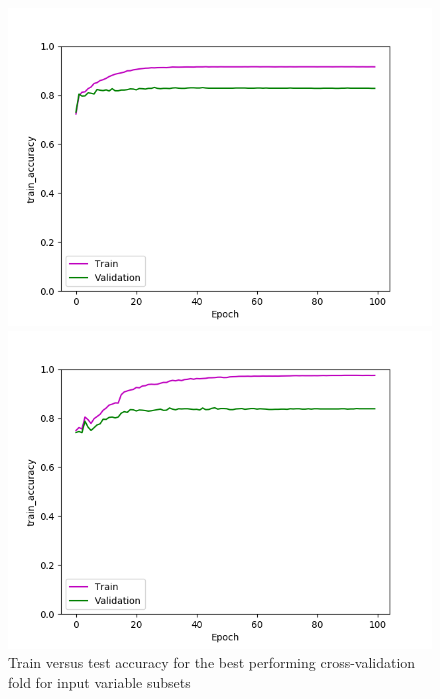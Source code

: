 \def\year{2017}\relax \documentclass[letterpaper]{article}
\begin{document}
\begin{figure}
\begin{minipage}{.24\textwidth}
  \centering
\includegraphics[width=\textwidth]{pics/d3_train_accuracy_best_train_test.png}
\caption{$D_3$}\label{fig:d3acctraintest}
\end{minipage}
\begin{minipage}{.01\textwidth}
\end{minipage}
\begin{minipage}{.24\textwidth}
  \centering
\includegraphics[width=\textwidth]{pics/d4_train_accuracy_best_train_test.png}
\caption{$D_4$}\label{fig:d4acctraintest}
\end{minipage}
\caption{Train versus test accuracy for the best performing cross-validation fold for input variable subsets}\label{fig:traintestacc}
\end{figure}
\end{document}
